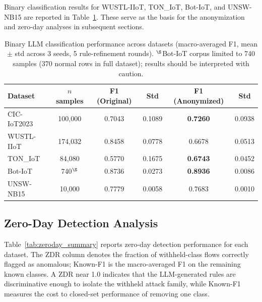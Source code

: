 
Binary classification results for WUSTL-IIoT, TON\_IoT, Bot-IoT, and UNSW-NB15
are reported in Table~\ref{tab:binary_llm_summary}. These serve as the basis
for the anonymization and zero-day analyses in subsequent sections.

\begin{table}[htbp]
\centering
\caption{Binary LLM classification performance across datasets
  (macro-averaged F1, mean $\pm$ std across 3 seeds, 5 rule-refinement rounds).
  $^\S$Bot-IoT corpus limited to 740 samples (370 normal rows in full dataset); results should be interpreted with caution.}
\label{tab:binary_llm_summary}
\begin{tabular}{lccccc}
\toprule
\textbf{Dataset} & \textbf{$n$ samples} & \textbf{F1 (Original)} & \textbf{Std} & \textbf{F1 (Anonymized)} & \textbf{Std} \\
\midrule
CIC-IoT2023  & 100{,}000 & 0.7043 & 0.1089 & \textbf{0.7260} & 0.0938 \\
WUSTL-IIoT   & 174{,}032 & 0.8458 & 0.0778 & 0.6678 & 0.0513 \\
TON\_IoT     & 84{,}080  & 0.5770 & 0.1675 & \textbf{0.6743} & 0.0452 \\
Bot-IoT      & 740$^\S$  & 0.8736 & 0.0273 & \textbf{0.8936} & 0.0086 \\
UNSW-NB15    & 10{,}000 & 0.7779 & 0.0058 & 0.7683 & 0.0010 \\
\bottomrule
\end{tabular}
\end{table}

\subsection{Zero-Day Detection Analysis}\label{subsec:zeroday_results}

Table~\ref{tab:zeroday_summary} reports zero-day detection performance for
each dataset. The ZDR column denotes the fraction of withheld-class flows
correctly flagged as anomalous; Known-F1 is the macro-averaged F1 on the
remaining known classes. A ZDR near 1.0 indicates that the LLM-generated rules
are discriminative enough to isolate the withheld attack family, while
Known-F1 measures the cost to closed-set performance of removing one class.

